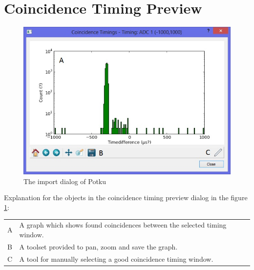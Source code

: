 \documentclass{scrreprt}
\begin{document}
\section{Coincidence Timing Preview}\label{importprevdialog}
\begin{figure}[H]
\centering
\includegraphics[width=140mm]{importprevdialog}
\caption{The import dialog of Potku}
\label{fig-importprevdialog}
\end{figure}
Explanation for the objects in the coincidence timing preview dialog in the figure \ref{fig-importprevdialog}:

\begin{tabular}{ll}
A & A graph which shows found coincidences between the selected timing window.\\
B & A toolset provided to pan, zoom and save the graph.\\
C & A tool for manually selecting a good coincidence timing window.\\
\end{tabular}

\end{document}
